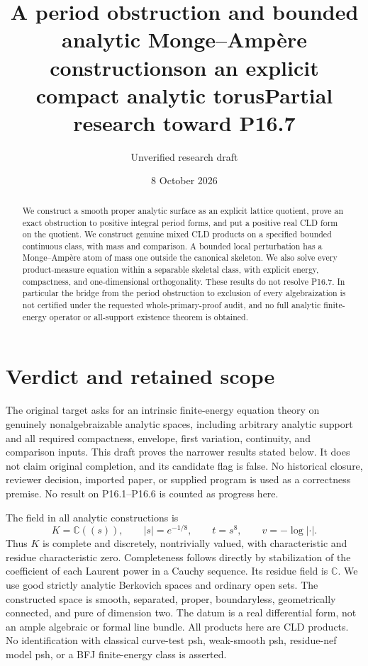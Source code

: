 \documentclass[11pt]{article}
\title{A period obstruction and bounded analytic Monge--Amp\`ere constructions\newline on an explicit compact analytic torus\newline Partial research toward P16.7}
\author{Unverified research draft}
\date{8 October 2026}
\theoremstyle{definition}\newtheorem{definition}[theorem]{Definition}
\begin{document}
\maketitle
\begin{abstract}
We construct a smooth proper analytic surface as an explicit lattice quotient,
prove an exact obstruction to positive integral period forms, and put a positive
real CLD form on the quotient. We construct genuine mixed CLD products on a
specified bounded continuous class, with mass and comparison. A bounded local
perturbation has a Monge--Amp\`ere atom of mass one outside the canonical
skeleton. We also solve every product-measure equation within a separable
skeletal class, with explicit energy, compactness, and one-dimensional
orthogonality. These results do not resolve P16.7. In particular the bridge
from the period obstruction to exclusion of every algebraization is not
certified under the requested whole-primary-proof audit, and no full analytic
finite-energy operator or all-support existence theorem is obtained.
\end{abstract}

\section{Verdict and retained scope}
The original target asks for an intrinsic finite-energy equation theory on
genuinely nonalgebraizable analytic spaces, including arbitrary analytic
support and all required compactness, envelope, first variation, continuity,
and comparison inputs. This draft proves the narrower results stated below.
It does not claim original completion, and its candidate flag is false.
No historical closure, reviewer decision, imported paper, or supplied program
is used as a correctness premise. No result on P16.1--P16.6 is counted as
progress here.

The field in all analytic constructions is
\[
 K=\mathbb C((s)),\qquad |s|=e^{-1/8},\qquad t=s^8,\qquad v=-\log|\cdot|.
\]
Thus $K$ is complete and discretely, nontrivially valued, with characteristic
and residue characteristic zero. Completeness follows directly by stabilization
of the coefficient of each Laurent power in a Cauchy sequence. Its residue
field is $\mathbb C$. We use good strictly analytic Berkovich spaces and
ordinary open sets. The constructed space is smooth, separated, proper,
boundaryless, geometrically connected, and pure of dimension two. The datum
is a real differential form, not an ample algebraic or formal line bundle.
All products here are CLD products. No identification with classical curve-test
psh, weak-smooth psh, residue-nef model psh, or a BFJ finite-energy class is
asserted.
\end{document}
